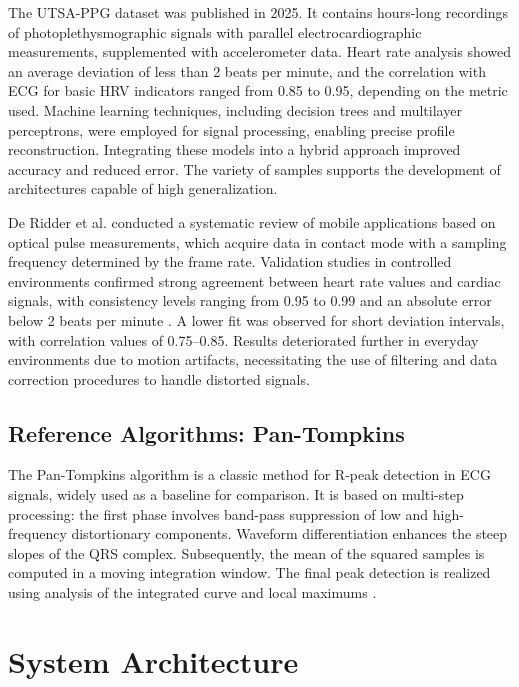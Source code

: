 \documentclass{citask}
\begin{document}
The UTSA-PPG dataset \cite{18} was published in 2025. It contains hours-long recordings of photoplethysmographic signals with parallel electrocardiographic measurements, supplemented with accelerometer data. Heart rate analysis showed an average deviation of less than 2 beats per minute, and the correlation with ECG for basic HRV indicators ranged from 0.85 to 0.95, depending on the metric used. Machine learning techniques, including decision trees and multilayer perceptrons, were employed for signal processing, enabling precise profile reconstruction. Integrating these models into a hybrid approach improved accuracy and reduced error. The variety of samples supports the development of architectures capable of high generalization.

De Ridder et al. \cite{19} conducted a systematic review of mobile applications based on optical pulse measurements, which acquire data in contact mode with a sampling frequency determined by the frame rate. Validation studies in controlled environments confirmed strong agreement between heart rate values and cardiac signals, with consistency levels ranging from 0.95 to 0.99 and an absolute error below 2 beats per minute \cite{20}. A lower fit was observed for short deviation intervals, with correlation values of 0.75–0.85. Results deteriorated further in everyday environments due to motion artifacts, necessitating the use of filtering and data correction procedures to handle distorted signals.

\subsection{Reference Algorithms: Pan-Tompkins}
The Pan-Tompkins algorithm is a classic method for R-peak detection in ECG signals, widely used as a baseline for comparison. It is based on multi-step processing: the first phase involves band-pass suppression of low and high-frequency distortionary components. Waveform differentiation enhances the steep slopes of the QRS complex. Subsequently, the mean of the squared samples is computed in a moving integration window. The final peak detection is realized using analysis of the integrated curve and local maximums \cite{27}.

\section{System Architecture}
\end{document}
